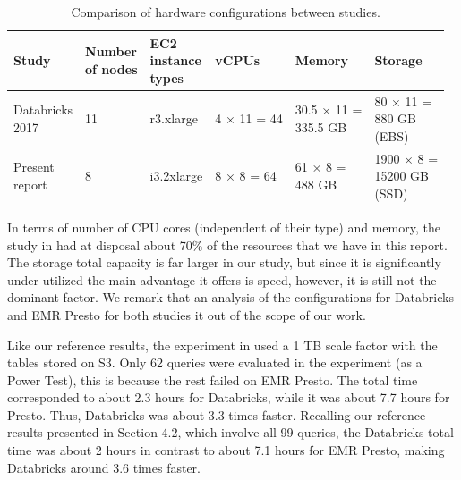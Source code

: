 \begin{table}
  \centering
	\begin{tabular}{|l|l|l|l|l|l|}
	  \hline
		\textbf{Study} & \makecell[l]{\bf Number \\ \bf of nodes} & \makecell[l]{\bf EC2 \\ \bf instance \\ \bf types} & \textbf{vCPUs} & \textbf{Memory} & \textbf{Storage} \\ \hline
		\makecell[l]{Databricks \\ 2017} & 11 & r3.xlarge & 4 × 11 = 44 & \makecell[l]{30.5 × 11 = \\ 335.5 GB} & \makecell[l]{80 × 11 = \\ 880 GB \\ (EBS)} \\ \hline
		\makecell[l]{Present \\ report} & 8 & i3.2xlarge & 8 × 8 = 64 & \makecell[l]{61 × 8 = \\ 488 GB} & \makecell[l]{1900 × 8 = \\ 15200 GB \\ (SSD)} \\ \hline
	\end{tabular}
	\caption{Comparison of hardware configurations between studies.}
	\label{table:comparisonStudiesConfigurations}
\end{table}

In terms of number of CPU cores (independent of their type) and memory, the study in \cite{databricksReport} had at disposal about 70\% of the resources that we have in this report. The storage total capacity is far larger in our study, but since it is significantly under-utilized the main advantage it offers is speed, however, it is still not the dominant factor. We remark that an analysis of the configurations for Databricks and EMR Presto for both studies it out of the scope of our work.

Like our reference results, the experiment in \cite{databricksReport} used a 1 TB scale factor with the tables stored on S3. Only 62 queries were evaluated in the experiment (as a Power Test), this is because the rest failed on EMR Presto. The total time corresponded to about 2.3 hours for Databricks, while it was about 7.7 hours for Presto. Thus, Databricks was about 3.3 times faster. Recalling our reference results presented in Section 4.2, which involve all 99 queries, the Databricks total time was about 2 hours in contrast to about 7.1 hours for EMR Presto, making Databricks around 3.6 times faster.


